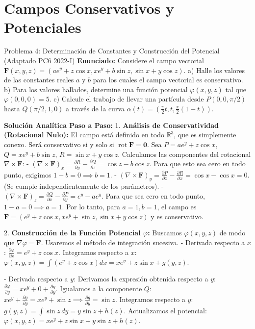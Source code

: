 \documentclass[11pt,a4paper]{article}
\begin{document}
\section{Campos Conservativos y Potenciales}

\begin{ejerciciobox}{Problema 4: Determinación de Constantes y Construcción del Potencial (Adaptado PC6 2022-I)}
\textbf{Enunciado:}
Considere el campo vectorial $\mathbf{F}(x,y,z) = (a e^y + z\cos x, x e^y + b\sin z, \sin x + y\cos z)$.
a) Halle los valores de las constantes reales $a$ y $b$ para los cuales el campo vectorial es conservativo.
b) Para los valores hallados, determine una función potencial $\varphi(x,y,z)$ tal que $\varphi(0,0,0) = 5$.
c) Calcule el trabajo de llevar una partícula desde $P(0,0,\pi/2)$ hasta $Q(\pi/2, 1, 0)$ a través de la curva $\alpha(t) = (\frac{\pi}{2}t, t, \frac{\pi}{2}(1-t))$.

\textbf{Solución Analítica Paso a Paso:}
1. \textbf{Análisis de Conservatividad (Rotacional Nulo):}
El campo está definido en todo $\mathbb{R}^3$, que es simplemente conexo. Será conservativo si y solo si $\operatorname{rot}\mathbf{F} = \mathbf{0}$.
Sea $P = a e^y + z\cos x$, $Q = x e^y + b\sin z$, $R = \sin x + y\cos z$.
Calculamos las componentes del rotacional $\nabla \times \mathbf{F}$:
- $(\nabla \times \mathbf{F})_x = \frac{\partial R}{\partial y} - \frac{\partial Q}{\partial z} = \cos z - b\cos z$. Para que esto sea cero en todo punto, exigimos $1 - b = 0 \implies b = 1$.
- $(\nabla \times \mathbf{F})_y = \frac{\partial P}{\partial z} - \frac{\partial R}{\partial x} = \cos x - \cos x = 0$. (Se cumple independientemente de los parámetros).
- $(\nabla \times \mathbf{F})_z = \frac{\partial Q}{\partial x} - \frac{\partial P}{\partial y} = e^y - a e^y$. Para que sea cero en todo punto, $1 - a = 0 \implies a = 1$.
Por lo tanto, para $a=1, b=1$, el campo es $\mathbf{F} = (e^y + z\cos x, x e^y + \sin z, \sin x + y\cos z)$ y es conservativo.

2. \textbf{Construcción de la Función Potencial $\varphi$:}
Buscamos $\varphi(x,y,z)$ de modo que $\nabla\varphi = \mathbf{F}$. Usaremos el método de integración sucesiva.
- Derivada respecto a $x$:
  $\frac{\partial \varphi}{\partial x} = e^y + z\cos x$.
  Integramos respecto a $x$:
  $\varphi(x,y,z) = \int (e^y + z\cos x) dx = x e^y + z\sin x + g(y,z)$.

- Derivada respecto a $y$:
  Derivamos la expresión obtenida respecto a $y$:
  $\frac{\partial \varphi}{\partial y} = x e^y + 0 + \frac{\partial g}{\partial y}$.
  Igualamos a la componente $Q$:
  $x e^y + \frac{\partial g}{\partial y} = x e^y + \sin z \implies \frac{\partial g}{\partial y} = \sin z$.
  Integramos respecto a $y$:
  $g(y,z) = \int \sin z \, dy = y\sin z + h(z)$.
  Actualizamos el potencial:
  $\varphi(x,y,z) = x e^y + z\sin x + y\sin z + h(z)$.


\end{ejerciciobox}
\end{document}

